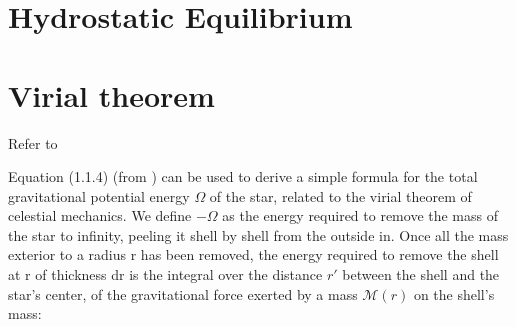 \documentclass{../template/texnote}
\begin{document}









\section{Hydrostatic Equilibrium}
\section{Virial theorem}
Refer to

Equation (1.1.4) (from \citeauthor{weinberg_lectures_2020}) can be used to derive a simple formula for the total gravitational potential energy $\Omega$ of the star, related to the virial theorem of celestial mechanics. We define $ - \Omega$ as the energy required to remove the mass of the star to infinity, peeling it shell by shell from the outside in.
Once all the mass exterior to a radius r has been removed, the energy required to remove the shell at r of thickness dr is the integral over the distance $r'$ %
between the shell and the star’s center, of the gravitational force exerted by a mass $\mathcal{M}(r)$  on the shell's mass:
\end{document}
